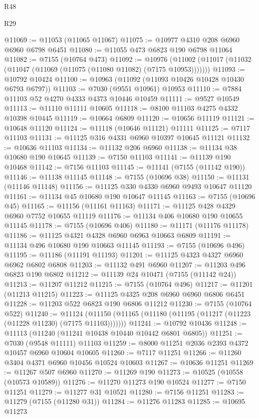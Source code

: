 \begin{lexlean}{R48}
\begin{lexlean}{R29}
\begin{coremodule}
{{{{{{{{{{{{{{{{{{{{{{{{{{{{{{{{{{{{{{{{{{{{{{{{{{{{{{{{{{{{{{{{{{{{{{{{{{{{{{{{{{{{{{{{{{{{{{{{{{{{{{{{{{{{{{{{{{{{{{{{{{{{{{{{{{{{{{{{{{{{{{{{{{{{{{{{{{{{{{{{{{{{{{{{{{{{{{{{{{{{{{{{{{{{{{{{{{{{{{{{{{{{{{{{{{{{{{{{{{@11069 := @11053 (@11065 @11067)
@11075 := @10977 @4310 @208 @6960 @6960 @6798 @6451
@11080 := @11055 @473 @6823 @190 @6798 @11064
@11082 := @7155 (@10764 @473)
@11092 := @10976
    (@11002 (@11017 (@11032 (@11047 (@11069 (@11075 (@11080 @11082) (@7175 @10953)))))))
@11093 := @10792 @10424
@11100 := @10963 (@11092 (@11093 @10426 @10428 @10430 @6793 @6797))
@11103 := @7030 (@9551 @10961) @10953
@11110 := @7884 @11103 @52 @4270 @4333 @4373 @10446 @10459
@11111 := @9527 @10549
@11113 := @11110 @11111 @10605
@11118 := @8100 @11103 @4275 @4332 @10398 @10445
@11119 := @10664 @6809
@11120 := @10656 @11119
@11121 := @10648 @11120
@11124 := @11118 (@10646 @11121) @11111
@11125 := @7117 @11103
@11131 := @11125 @316 @4331 @6960 @10397 @10645 @11121
@11132 := @10636 @11103
@11134 := @11132 @206 @6960
@11138 := @11134 @38 @10680 @190 @10645
@11139 := @7150 @11103
@11141 := @11139 @190 @10468
@11142 := @7156 @11103
@11145 := @11141 (@7155 (@11142 @190))
@11146 := @11138 @11145
@11148 := @7155 (@10696 @38)
@11150 := @11131 (@11146 @11148)
@11156 := @11125 @330 @4330 @6960 @9493 @10647 @11120
@11161 := @11134 @45 @10680 @190 @10647 @11145
@11163 := @7155 (@10696 @45)
@11165 := @11156 (@11161 @11163)
@11171 := @11125 @428 @4329 @6960 @7752 @10655 @11119
@11176 := @11134 @406 @10680 @190 @10655 @11145
@11178 := @7155 (@10696 @406)
@11180 := @11171 (@11176 @11178)
@11186 := @11125 @4321 @4328 @6960 @6963 @10663 @6809
@11191 := @11134 @496 @10680 @190 @10663 @11145
@11193 := @7155 (@10696 @496)
@11195 := @11186 (@11191 @11193)
@11201 := @11125 @4323 @4327 @6960 @6962 @6802 @6808
@11203 := @11132 @491 @6960
@11207 := @11203 @496 @6823 @190 @6802
@11212 := @11139 @24 @10471 (@7155 (@11142 @24))
@11213 := @11207 @11212
@11215 := @7155 (@10764 @496)
@11217 := @11201 (@11213 @11215)
@11223 := @11125 @4325 @208 @6960 @6960 @6806 @6451
@11228 := @11203 @522 @6823 @190 @6806 @11212
@11230 := @7155 (@10764 @522)
@11240 := @11124
    (@11150 (@11165 (@11180 (@11195 (@11217 (@11223 (@11228 @11230) (@7175 @11103)))))))
@11241 := @10792 @10436
@11248 := @11113 (@11240 (@11241 @10438 @10440 @10442 @6801 @6805))
@11251 := @7030 (@9548 @11111) @11103
@11259 := @8000 @11251 @2036 @2393 @4372 @10457 @6960 @10604 @10605
@11260 := @7117 @11251
@11266 := @11260 @3404 @4371 @6960 @10456 @10524 @10603
@11267 := @10636 @11251
@11269 := @11267 @507 @6960
@11270 := @11269 @190
@11273 := @10525 (@10558 (@10573 @10589))
@11276 := @11270 @11273 @190 @10524
@11277 := @7150 @11251
@11279 := @11277 @31 @10521
@11280 := @7156 @11251
@11283 := @11279 (@7155 (@11280 @31))
@11284 := @11276 @11283
@11285 := @10695 @11273
}}}}}}}}}}}}}}}}}}}}}}}}}}}}}}}}}}}}}}}}}}}}}}}}}}}}}}}}}}}}}}}}}}}}}}}}}}}}}}}}}}}}}}}}}}}}}}}}}}}}}}}}}}}}}}}}}}}}}}}}}}}}}}}}}}}}}}}}}}}}}}}}}}}}}}}}}}}}}}}}}}}}}}}}}}}}}}}}}}}}}}}}}}}}}}}}}}}}}}}}}}}}}}}}}}}}}}}}}}
\end{coremodule}
\end{lexlean}
\end{lexlean}
